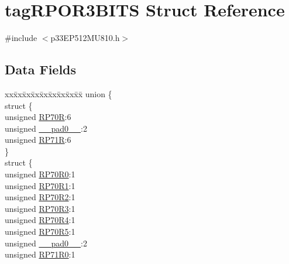 \hypertarget{structtag_r_p_o_r3_b_i_t_s}{}\section{tag\+R\+P\+O\+R3\+B\+I\+TS Struct Reference}
\label{structtag_r_p_o_r3_b_i_t_s}


{\ttfamily \#include $<$p33\+E\+P512\+M\+U810.\+h$>$}

\subsection*{Data Fields}
\begin{DoxyCompactItemize}
\item 
\begin{tabbing}
xx\=xx\=xx\=xx\=xx\=xx\=xx\=xx\=xx\=\kill
union \{\\
\>struct \{\\
\>\>unsigned \hyperlink{structtag_r_p_o_r3_b_i_t_s_adb10c6c8a46cdac03b56ef6ce6f91b69}{RP70R}:6\\
\>\>unsigned \hyperlink{structtag_r_p_o_r3_b_i_t_s_adf71f3d8410c1f1dbbc96680a92c49af}{\_\_pad0\_\_}:2\\
\>\>unsigned \hyperlink{structtag_r_p_o_r3_b_i_t_s_a55e7d2f65d2e92b7e42d33ddab8eb125}{RP71R}:6\\
\>\} \\
\>struct \{\\
\>\>unsigned \hyperlink{structtag_r_p_o_r3_b_i_t_s_a7dc38553625f79d7e457e1b15eeff1a5}{RP70R0}:1\\
\>\>unsigned \hyperlink{structtag_r_p_o_r3_b_i_t_s_ace4fb0068d0a9988cb2a2a8ee04fade6}{RP70R1}:1\\
\>\>unsigned \hyperlink{structtag_r_p_o_r3_b_i_t_s_a9e2f0a8a20641289fcb11428e987e858}{RP70R2}:1\\
\>\>unsigned \hyperlink{structtag_r_p_o_r3_b_i_t_s_aeb897b9518130a094e2ad40aafb4948c}{RP70R3}:1\\
\>\>unsigned \hyperlink{structtag_r_p_o_r3_b_i_t_s_a08ceec692d9a9c3b9a0e1a5b0b8b7eee}{RP70R4}:1\\
\>\>unsigned \hyperlink{structtag_r_p_o_r3_b_i_t_s_a2db8d05ca2e3a34dedf17836de31ceaa}{RP70R5}:1\\
\>\>unsigned \hyperlink{structtag_r_p_o_r3_b_i_t_s_adf71f3d8410c1f1dbbc96680a92c49af}{\_\_pad0\_\_}:2\\
\>\>unsigned \hyperlink{structtag_r_p_o_r3_b_i_t_s_a8f09b7ae821df972962b0711da3b086a}{RP71R0}:1\\

\end{tabbing}
\end{DoxyCompactItemize}
